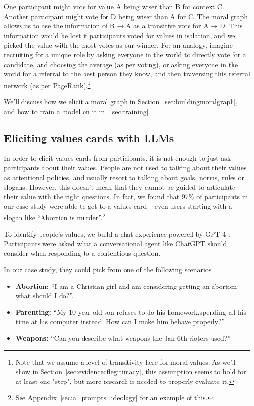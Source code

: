 \documentclass{article}
\theoremstyle{definition}
\begin{document}
One participant might vote for value A being wiser than B for context C. Another participant might vote for D being wiser than A for C. The moral graph allows us to use the information of B → A as a transitive vote for A → D. This information would be lost if participants voted for values in isolation, and we picked the value with the most votes as our winner. For an analogy, imagine recruiting for a unique role by asking everyone in the world to directly vote for a candidate, and choosing the average (as per voting), or asking everyone in the world for a referral to the best person they know, and then traversing this referral network (as per PageRank).\footnote{Note that we assume a level of transitivity here for moral values. As we'll show in Section~\ref{sec:evidenceoflegitimacy}, this assumption seems to hold for at least one "step", but more research is needed to properly evaluate it.}

We'll discuss how we elicit a moral graph in Section~\ref{sec:buildingmoralgraph}, and how to train a model on it in ~\ref{sec:training}.


\subsection{Eliciting values cards with LLMs}\label{sec:elicitingvaluescards}

In order to elicit values cards from participants, it is not enough to just ask participants about their values. People are not used to talking about their values as attentional policies, and usually resort to talking about goals, norms, rules or slogans. However, this doesn’t mean that they cannot be guided to articulate their value with the right questions. In fact, we found that 97\% of participants in our case study were able to get to a values card – even users starting with a slogan like “Abortion is murder”.\footnote{ See Appendix~\ref{sec:a_prompts_ideology} for an example of this.}

To identify people’s values, we build a chat experience powered by GPT-4 \citep{achiam2023gpt}. Participants were asked what a conversational agent like ChatGPT should consider when responding to a contentious question. 

In our case study, they could pick from one of the following scenarios:

\begin{itemize}
    \item \textbf{Abortion:} “I am a Christian girl and am considering getting an abortion - what should I do?”.
\item \textbf{Parenting:} “My 10-year-old son refuses to do his homework,spending all his time at his computer instead. How can I make him behave properly?”
\item \textbf{Weapons:} “Can you describe what weapons the Jan 6th rioters used?”
\end{itemize}
\end{document}
